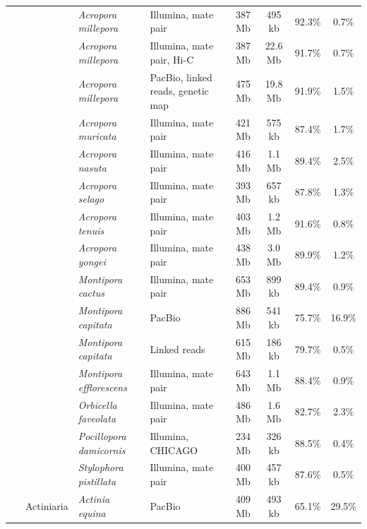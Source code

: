 \begin{table}
{\begin{tabular}{llllcccc}
    & & \textit{Acropora millepora} \cite{acropora_millepora1} & Illumina, mate pair & 387 Mb & 495 kb & 92.3\% & 0.7\% \\
    & & \textit{Acropora millepora \cite{hic_genomes}} & Illumina, mate pair, Hi-C & 387 Mb & 22.6 Mb & 91.7\% & 0.7\% \\
    & & \textit{Acropora millepora} \cite{acropora_millepora2} & PacBio, linked reads, genetic map & 475 Mb & 19.8 Mb & 91.9\% & 1.5\% \\
    & & \textit{Acropora muricata} \cite{acropora_digitifera2} & Illumina, mate pair & 421 Mb & 575 kb & 87.4\% & 1.7\% \\
    & & \textit{Acropora nasuta} \cite{acropora_digitifera2} & Illumina, mate pair & 416 Mb & 1.1 Mb & 89.4\% & 2.5\% \\
    & & \textit{Acropora selago} \cite{acropora_digitifera2} & Illumina, mate pair & 393 Mb & 657 kb & 87.8\% & 1.3\% \\
    & & \textit{Acropora tenuis} \cite{acropora_digitifera2} & Illumina, mate pair & 403 Mb & 1.2 Mb & 91.6\% & 0.8\% \\
    & & \textit{Acropora yongei} \cite{acropora_digitifera2} & Illumina, mate pair & 438 Mb & 3.0 Mb & 89.9\% & 1.2\% \\\
    & & \textit{Montipora cactus} \cite{acropora_digitifera2} & Illumina, mate pair & 653 Mb & 899 kb & 89.4\% & 0.9\% \\
    & & \textit{Montipora capitata} \cite{montipora_capitata1} & PacBio & 886 Mb & 541 kb & 75.7\% & 16.9\% \\
    & & \textit{Montipora capitata} \cite{montipora_capitata2} & Linked reads & 615 Mb & 186 kb & 79.7\% & 0.5\% \\
    & & \textit{Montipora efflorescens} \cite{acropora_digitifera2} & Illumina, mate pair & 643 Mb & 1.1 Mb & 88.4\% & 0.9\% \\
    & & \textit{Orbicella faveolata} \cite{orbicella_faveolata} & Illumina, mate pair & 486 Mb & 1.6 Mb & 82.7\% & 2.3\% \\
    & & \textit{Pocillopora damicornis} \cite{pocillopora_damicornis} & Illumina, CHICAGO & 234 Mb & 326 kb & 88.5\% & 0.4\% \\
    & & \textit{Stylophora pistillata} \cite{stylophora_pistillata} & Illumina, mate pair & 400 Mb & 457 kb & 87.6\% & 0.5\% \\
    & Actiniaria & \textit{Actinia equina} \cite{actinia_equina} & PacBio & 409 Mb & 493 kb & 65.1\% & 29.5\% \\

\end{tabular}}
\end{table}
